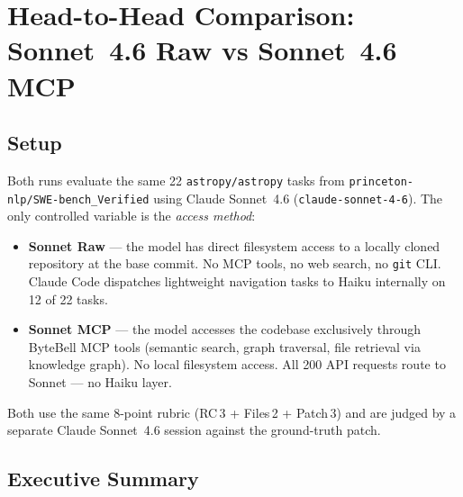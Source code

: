 
\section{Head-to-Head Comparison: Sonnet~4.6 Raw vs Sonnet~4.6 MCP}
\label{sec:comparison-sonnet}

\subsection{Setup}

Both runs evaluate the same 22 \texttt{astropy/astropy} tasks from
\texttt{princeton-nlp/SWE-bench\_Verified} using
Claude Sonnet~4.6 (\texttt{claude-sonnet-4-6}).
The only controlled variable is the \emph{access method}:

\begin{itemize}
  \item \textbf{Sonnet Raw} --- the model has direct filesystem access to a
        locally cloned repository at the base commit.
        No MCP tools, no web search, no \texttt{git} CLI.
        Claude Code dispatches lightweight navigation tasks to Haiku
        internally on 12 of 22 tasks.
  \item \textbf{Sonnet MCP} --- the model accesses the codebase exclusively
        through ByteBell MCP tools (semantic search, graph traversal,
        file retrieval via knowledge graph).  No local filesystem access.
        All 200 API requests route to Sonnet --- no Haiku layer.
\end{itemize}

\noindent
Both use the same 8-point rubric
(RC\,3 + Files\,2 + Patch\,3) and are judged by a separate
Claude Sonnet~4.6 session against the ground-truth patch.

\subsection{Executive Summary}

